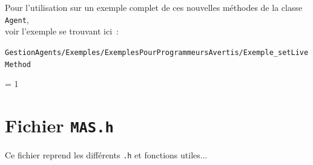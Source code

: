 \documentclass[12pt]{article}
\begin{document}
\vspace{0.5cm}

Pour l'utilisation sur un exemple complet de ces nouvelles m\'ethodes
de la classe {\tt Agent},\\
voir l'exemple se trouvant ici~:
\vspace{-0.5cm}
\begin{center}
{\tt GestionAgents/Exemples/ExemplesPourProgrammeursAvertis/Exemple\_setLiveMethod}
\end{center}


 = 1
\newpage
\section{Fichier {\tt MAS.h}}

Ce fichier reprend les diff\'erents {\tt .h} et fonctions
utiles...
\end{document}
